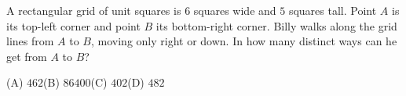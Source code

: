A rectangular grid of unit squares is $6$ squares wide and $5$ squares tall. Point $A$ is its top-left corner and point $B$ its bottom-right corner. Billy walks along the grid lines from $A$ to $B$, moving only right or down. In how many distinct ways can he get from $A$ to $B$?

(A) $462$\qquad (B) $86400$\qquad (C) $402$\qquad (D) $482$
